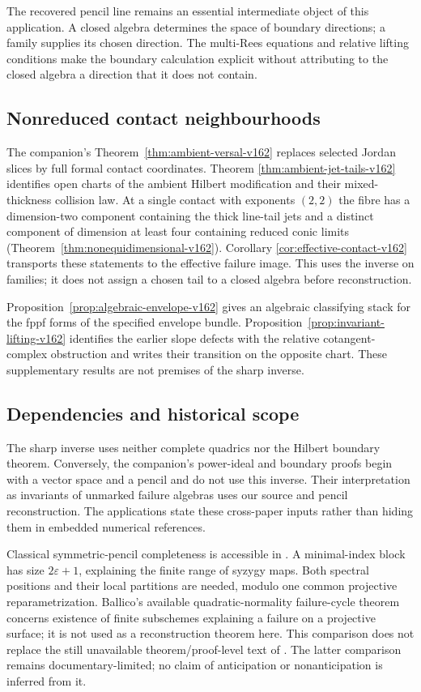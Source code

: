 \documentclass[11pt,reqno]{amsart}
\numberwithin{equation}{section}
\theoremstyle{definition}\newtheorem{definition}[theorem]{Definition}
\theoremstyle{remark}\newtheorem{remark}[theorem]{Remark}
\begin{document}
The recovered pencil line remains an essential intermediate object
of this application. A closed algebra determines the space of
boundary directions; a family supplies its chosen direction. The
multi-Rees equations and relative lifting conditions make the
boundary calculation explicit without attributing to the closed
algebra a direction that it does not contain.

\subsection{Nonreduced contact neighbourhoods}
The companion's Theorem~\ref{thm:ambient-versal-v162} replaces selected
Jordan slices by full formal contact coordinates. Theorem
\ref{thm:ambient-jet-tails-v162} identifies open charts of the ambient
Hilbert modification and their mixed-thickness collision law. At a
single contact with exponents $(2,2)$ the fibre has a dimension-two
component containing the thick line-tail jets and a distinct component
of dimension at least four containing reduced conic limits
(Theorem~\ref{thm:nonequidimensional-v162}). Corollary
\ref{cor:effective-contact-v162} transports these statements to the
effective failure image. This uses the inverse on families; it does
not assign a chosen tail to a closed algebra before reconstruction.

Proposition~\ref{prop:algebraic-envelope-v162} gives an algebraic
classifying stack for the fppf forms of the specified envelope bundle.
Proposition~\ref{prop:invariant-lifting-v162} identifies the earlier
slope defects with the relative cotangent-complex obstruction and
writes their transition on the opposite chart. These supplementary
results are not premises of the sharp inverse.

\subsection{Dependencies and historical scope}
The sharp inverse uses neither complete quadrics nor the Hilbert
boundary theorem. Conversely, the companion's power-ideal and
boundary proofs begin with a vector space and a pencil and do not
use this inverse. Their interpretation as invariants of unmarked
failure algebras uses our source and pencil reconstruction. The
applications state these cross-paper inputs rather than hiding them
in embedded numerical references.

Classical symmetric-pencil completeness is accessible in
\cite[Theorem~2.1]{DeTeranDmytryshynDopico2018v161}. A minimal-index
block has size $2\varepsilon+1$, explaining the finite range of
syzygy maps. Both spectral positions and their local partitions are
needed, modulo one common projective reparametrization.
Ballico's available quadratic-normality failure-cycle theorem
\cite[Theorem~0.2]{Ballico1996v161} concerns existence of finite
subschemes explaining a failure on a projective surface; it is not
used as a reconstruction theorem here. This comparison does not
replace the still unavailable theorem/proof-level text of
\cite{Ballico93}. The latter comparison remains documentary-limited;
no claim of anticipation or nonanticipation is inferred from it.
\end{document}
